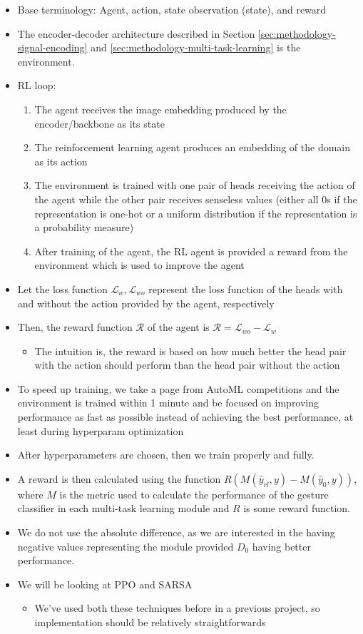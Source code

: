 \begin{itemize}
	\item Base terminology: Agent, action, state observation (state), and reward
	\item The encoder-decoder architecture described in Section \ref{sec:methodology-signal-encoding} and \ref{sec:methodology-multi-task-learning} is the environment.
	\item RL loop:
	\begin{enumerate}
		\item The agent receives the image embedding produced by the encoder/backbone as its state
		\item The reinforcement learning agent produces an embedding of the domain as its action
		\item The environment is trained with one pair of heads receiving the action of the agent while the other pair receives senseless values (either all 0s if the representation is one-hot or a uniform distribution if the representation is a probability measure)
		\item After training of the agent, the RL agent is provided a reward from the environment which is used to improve the agent
	\end{enumerate}
	\item Let the loss function $\mathcal{L}_{w}, \mathcal{L}_{wo}$ represent the loss function of the heads with and without the action provided by the agent, respectively
	\item Then, the reward function $\mathcal{R}$ of the agent is $\mathcal{R} = \mathcal{L}_{wo} - \mathcal{L}_{w}$
	\begin{itemize}
		\item The intuition is, the reward is based on how much better the head pair with the action should perform than the head pair without the action
	\end{itemize}
	\item To speed up training, we take a page from AutoML competitions and the environment is trained within 1 minute and be focused on improving performance as fast as possible instead of achieving the best performance, at least during hyperparam optimization
	\item After hyperparameters are chosen, then we train properly and fully.
	\item A reward is then calculated using the function $R\left(M\left(\hat{y}_{rl}, y\right)-M\left(\hat{y}_{0}, y\right)\right)$, where $M$ is the metric used to calculate the performance of the gesture classifier in each multi-task learning module and $R$ is some reward function.
	\item We do not use the absolute difference, as we are interested in the having negative values representing the module provided $D_0$ having better performance.
	\item We will be looking at PPO \cite{schulman2017proximal} and SARSA \cite{rummery1994line}
	\begin{itemize}
		\item We've used both these techniques before in a previous project, so implementation should be relatively straightforwards
	\end{itemize}
\end{itemize}

